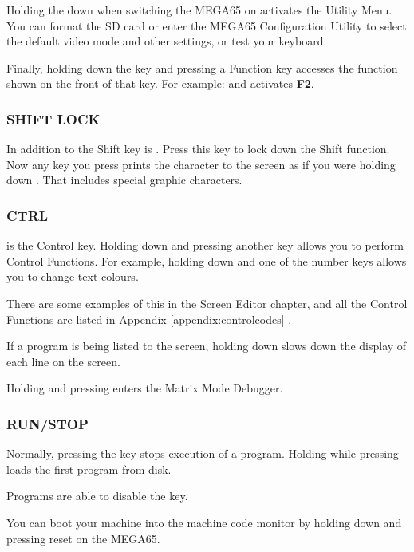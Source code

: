 Holding the  down when switching the MEGA65 on activates the Utility Menu. You can format the SD card or enter the MEGA65 Configuration Utility to select the default video mode and other settings, or test your keyboard.

Finally, holding down the  key and pressing a Function key accesses the function shown on the front of that key. For example:  and  activates \textbf{F2}.


\subsubsection{SHIFT LOCK}

In addition to the Shift key is . Press this key to lock down the Shift function. Now any key you press prints the character to the screen as if you were holding down . That includes special graphic characters.

\subsubsection{CTRL}

 is the Control key. Holding down  and pressing another key allows you to perform Control Functions. For example, holding down  and one of the number keys allows you to change text colours.

There are some examples of this in the Screen Editor chapter, and all the Control Functions are listed in Appendix \ref{appendix:controlcodes}  .

If a program is being listed to the screen, holding down  slows down the display of each line on the screen.

Holding  and pressing \megakey{*} enters the Matrix Mode Debugger.

\subsubsection{RUN/STOP}

Normally, pressing the  key stops execution of a program. Holding  while pressing  loads the first program from disk.

Programs are able to disable the  key.

You can boot your machine into the machine code monitor by holding down  and pressing reset on the MEGA65.

